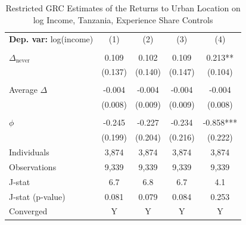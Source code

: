 \begin{table}[htbp] \centering \begin{threeparttable}
 \caption{Restricted GRC Estimates of the Returns to Urban Location on log Income, Tanzania, Experience Share Controls} 
 \label{tab:GRC_TZA_income_urban_unb_exp_sh} 
\begin{tabular}{l cccc} \toprule  \textbf{Dep. var:}  log(income) 
                    &\multicolumn{1}{c}{(1)}   &\multicolumn{1}{c}{(2)}   &\multicolumn{1}{c}{(3)}   &\multicolumn{1}{c}{(4)}   \\
                    &               &               &               &               \\
\addlinespace
$\Delta_{\text{never}}$&       0.109   &       0.102   &       0.109   &       0.213** \\
                    &     (0.137)   &     (0.140)   &     (0.147)   &     (0.104)   \\
                    &               &               &               &               \\
\addlinespace
Average $\Delta$    &      -0.004   &      -0.004   &      -0.004   &      -0.004   \\
                    &     (0.008)   &     (0.009)   &     (0.009)   &     (0.008)   \\
                    &               &               &               &               \\
\addlinespace
$\phi$              &      -0.245   &      -0.227   &      -0.234   &      -0.858***\\
                    &     (0.199)   &     (0.204)   &     (0.216)   &     (0.222)   \\
\addlinespace
Individuals         &       3,874   &       3,874   &       3,874   &       3,874   \\
Observations        &       9,339   &       9,339   &       9,339   &       9,339   \\
J-stat              &         6.7   &         6.8   &         6.7   &         4.1   \\
J-stat (p-value)    &       0.081   &       0.079   &       0.084   &       0.253   \\
Converged           &           Y   &           Y   &           Y   &           Y   \\

\end{tabular}
\end{threeparttable}
\end{table}
